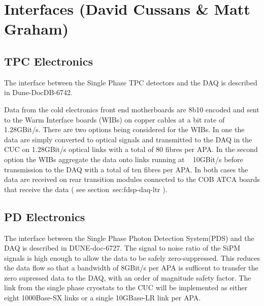
\section{Interfaces (David Cussans \& Matt Graham)}
\label{sec:fdsp-daq-intfc}



\subsection{TPC Electronics}
\label{sec:fdsp-daq-intfc-elec}

The interface between the Single Phase TPC detectors and the DAQ is described in Dune-DocDB-6742.

Data from the cold electronics front end motherboards are 8b10 encoded
and sent to the Warm Interface boards (WIBs) on copper cables at a bit
rate of 1.28GBit/s. There are two options being considered for the
WIBs. In one the data are simply converted to optical signals and
transmitted to the DAQ in the CUC on 1.28GBit/s optical links with a
total of 80 fibres per APA. In the second option the WIBs aggregate
the data onto links running at ~ 10GBit/s before transmission to the
DAQ with a total of ten fibres per APA. In both cases the data are
received on rear transition modules connected to the COB ATCA boards
that receive the data ( see section~{sec:fdsp-daq-ltr} ).



\subsection{PD Electronics}
\label{sec:fdsp-daq-intfc-photon}

The interface between the Single Phase Photon Detection System(PDS)
and the DAQ is described in DUNE-doc-6727. The signal to noise ratio
of the SiPM signals is high enough to allow the data to be safely
zero-suppressed. This reduces the data flow so that a bandwidth of
8GBit/s per APA is sufficent to transfer the zero supressed data to
the DAQ, with an order of magnitude safety factor. The link from the
single phase cryostats to the CUC will be implemented as either eight
1000Base-SX links  or a single 10GBase-LR link per APA.

